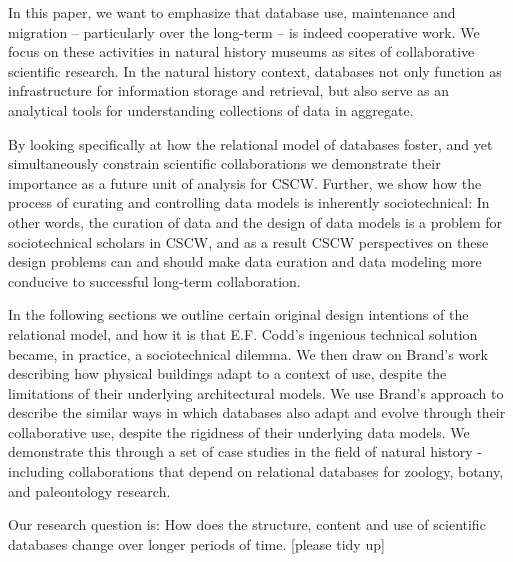 In this paper, we want to emphasize that database use, maintenance and migration – particularly over the long-term – is indeed cooperative work. We focus on these activities in natural history museums as sites of collaborative scientific research. In the natural history context, databases not only function as infrastructure for information storage and retrieval, but also serve as an analytical tools for understanding collections of data in aggregate. 

By looking specifically at how the relational model of databases foster, and yet simultaneously constrain scientific collaborations we demonstrate their importance as a future unit of analysis for CSCW. Further, we show how the process of curating and controlling data models is inherently sociotechnical: In other words, the curation of data and the design of data models is a problem for sociotechnical scholars in CSCW, and as a result CSCW perspectives on these design problems can and should make data curation and data modeling more conducive to successful long-term collaboration. 

In the following sections we outline certain original design intentions of the relational model, and how it is that E.F. Codd's ingenious technical solution became, in practice, a sociotechnical dilemma. We then draw on Brand's work describing how physical buildings adapt to a context of use, despite the limitations of their underlying architectural models. We use Brand's approach to describe the similar ways in which databases also adapt and evolve through their collaborative use, despite the rigidness of their underlying data models. We demonstrate this through a set of case studies in the field of natural history - including collaborations that depend on relational databases for zoology, botany, and paleontology research.  

Our research question is: How does the structure, content and use of scientific databases change over longer periods of time. [please tidy up]
